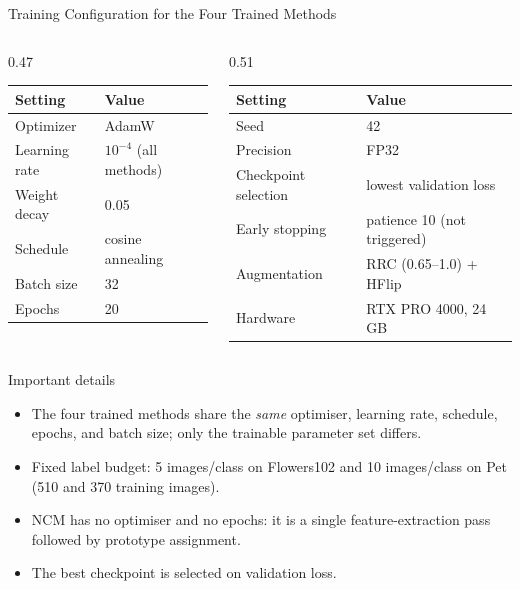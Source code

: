 \documentclass[10pt, aspectratio=169]{beamer}
\begin{document}
\begin{frame}[t]{Training Configuration for the Four Trained Methods}
  \begin{columns}[T]
    \begin{column}{0.47\textwidth}
      \small
      \setlength{\tabcolsep}{4pt}
      \begin{tabular}{ll}
        \toprule
        \textbf{Setting} & \textbf{Value} \\
        \midrule
        Optimizer & AdamW \\
        Learning rate & $10^{-4}$ (all methods) \\
        Weight decay & 0.05 \\
        Schedule & cosine annealing \\
        Batch size & 32 \\
        Epochs & 20 \\
        \bottomrule
      \end{tabular}
    \end{column}
    \begin{column}{0.51\textwidth}
      \small
      \setlength{\tabcolsep}{4pt}
      \begin{tabular}{ll}
        \toprule
        \textbf{Setting} & \textbf{Value} \\
        \midrule
        Seed & 42 \\
        Precision & FP32 \\
        Checkpoint selection & lowest validation loss \\
        Early stopping & patience 10 (not triggered) \\
        Augmentation & RRC (0.65--1.0) + HFlip \\
        Hardware & RTX PRO 4000, 24\,GB \\
        \bottomrule
      \end{tabular}
    \end{column}
  \end{columns}

  \vspace{0.25cm}
  \begin{block}{Important details}
    \footnotesize
    \begin{itemize}
      \item The four trained methods share the \emph{same} optimiser, learning rate, schedule, epochs, and batch size; only the trainable parameter set differs.
      \item Fixed label budget: 5 images/class on Flowers102 and 10 images/class on Pet (510 and 370 training images).
      \item NCM has no optimiser and no epochs: it is a single feature-extraction pass followed by prototype assignment.
      \item The best checkpoint is selected on validation loss.
    \end{itemize}
  \end{block}
\end{frame}
\end{document}
